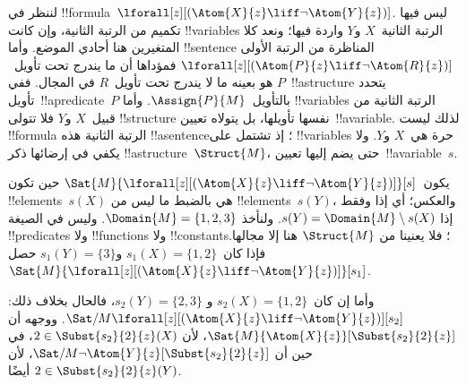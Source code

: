 \documentclass[../../../include/open-logic-section]{subfiles}
\begin{document}
\begin{ex}
  لننظر في !!{formula}~$\lforall[z][(\Atom{X}{z} \liff \lnot
    \Atom{Y}{z})]$. ليس فيها تكميم من الرتبة الثانية، وإن كانت
  !!{variable}s الرتبة الثانية~$X$ و$Y$ واردة فيها؛ ونعد كلا
  المتغيرين هنا أحادي الموضع. وأما !!{sentence} المناظرة من الرتبة
  الأولى
  $\lforall[z][(\Atom{P}{z} \liff \lnot \Atom{R}{z})]$ فمؤداها أن
  ما يندرج تحت تأويل~$P$ هو بعينه ما لا يندرج تحت تأويل~$R$ في المجال.
  ففي~!!a{structure} يتحدد تأويل~!!a{predicate}~$P$
  بالتأويل~$\Assign{P}{M}$. وأما !!{variable}s الرتبة الثانية
  من قبيل~$X$ و$Y$ فلا تتولى !!{structure} نفسها تأويلها، بل يتولاه
  تعيين~!!a{variable}. لذلك ليست !!{formula} الرتبة الثانية هذه
  !!a{sentence}؛ إذ تشتمل على !!{variable}s حرة هي~$X$ و$Y$.
  ولا يكفي في إرضائها ذكر !!a{structure}~$\Struct{M}$، حتى يضم
  إليها تعيين~!!a{variable}~$s$.

  يكون~$\Sat{M}{\lforall[z][(\Atom{X}{z} \liff \lnot
    \Atom{Y}{z})]}[s]$ حين تكون !!{element}s~$s(X)$ هي بالضبط
  ما ليس من !!{element}s~$s(Y)$، والعكس؛ أي إذا وفقط إذا
  $s(Y) = \Domain{M} \setminus s(X)$. ولنأخذ
  $\Domain{M} = \{1, 2, 3\}$. وليس في الصيغة !!{predicate}s
  ولا !!{function}s ولا !!{constant}s؛ فلا يعنينا من
  $\Struct{M}$ هنا إلا مجالها.
  فإذا كان~$s_1(X) = \{1, 2\}$ و$s_1(Y) = \{3\}$ حصل
  $\Sat{M}{\lforall[z][(\Atom{X}{z}
      \liff \lnot \Atom{Y}{z})]}[s_1]$.

  وأما إن كان~$s_2(X) = \{1, 2\}$ و
  $s_2(Y) = \{2, 3\}$، فالحال بخلاف ذلك:
  $\Sat/{M}{\lforall[z][(\Atom{X}{z} \liff \lnot
      \Atom{Y}{z})]}[s_2]$. ووجهه أن
  $\Sat{M}{\Atom{X}{z}}[\Subst{s_2}{2}{z}]$، لأن
  $2 \in \Subst{s_2}{2}{z}(X)$، في حين أن
  $\Sat/{M}{\lnot \Atom{Y}{z}}[\Subst{s_2}{2}{z}]$، لأن
  $2 \in \Subst{s_2}{2}{z}(Y)$ أيضًا.
\end{ex}
\end{document}
